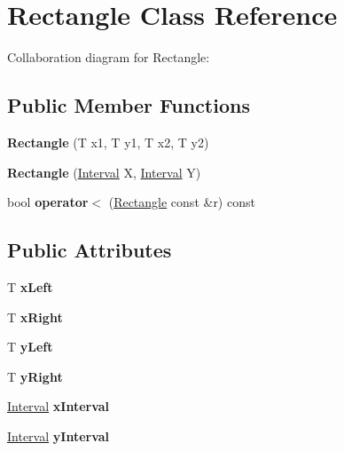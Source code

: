 \hypertarget{classRectangle}{}\section{Rectangle Class Reference}
\label{classRectangle}


Collaboration diagram for Rectangle\+:
\subsection*{Public Member Functions}
\begin{DoxyCompactItemize}
\item 
\mbox{\label{classRectangle_a80d54f2c89abd639f5299c123f1d8052}} 
{\bfseries Rectangle} (T x1, T y1, T x2, T y2)
\item 
\mbox{\label{classRectangle_a0e8638f3826e534f415a3354536405b2}} 
{\bfseries Rectangle} (\hyperlink{classInterval}{Interval} X, \hyperlink{classInterval}{Interval} Y)
\item 
\mbox{\label{classRectangle_ae8a10f9500dab913ee2ed41ab5f6ebe5}} 
bool {\bfseries operator$<$} (\hyperlink{classRectangle}{Rectangle} const \&r) const
\end{DoxyCompactItemize}
\subsection*{Public Attributes}
\begin{DoxyCompactItemize}
\item 
\mbox{\label{classRectangle_aa1f4e63072f4b04b27f9824f61550455}} 
T {\bfseries x\+Left}
\item 
\mbox{\label{classRectangle_a1a86ad326e4c680928d5a45535211703}} 
T {\bfseries x\+Right}
\item 
\mbox{\label{classRectangle_a53e549e4a31de48d2e44eb4dc5b65c26}} 
T {\bfseries y\+Left}
\item 
\mbox{\label{classRectangle_ab5aa4b2b4bc16f2f7ee1c6776d734dab}} 
T {\bfseries y\+Right}
\item 
\mbox{\label{classRectangle_a46752e3fb7782b2c1226cf1e894ca8f3}} 
\hyperlink{classInterval}{Interval} {\bfseries x\+Interval}
\item 
\mbox{\label{classRectangle_a78ca87b2478f720ec6c9aa8b575b6856}} 
\hyperlink{classInterval}{Interval} {\bfseries y\+Interval}
\end{DoxyCompactItemize}


